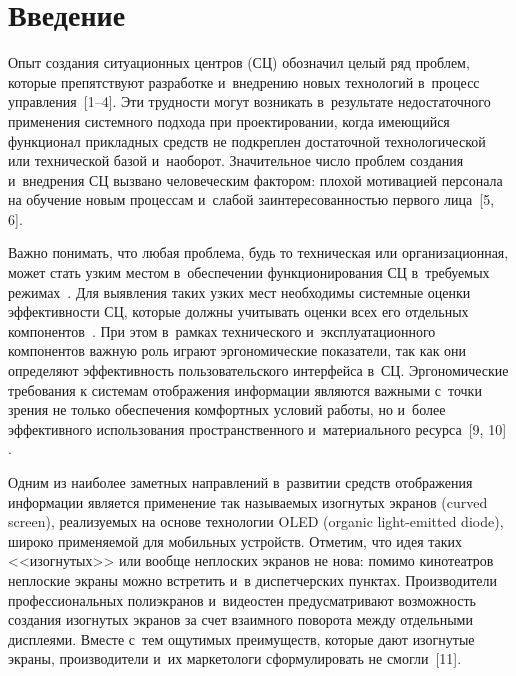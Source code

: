 
\thispagestyle{headings}

\begin{multicols}{2}

\label{st\stat}

\section{Введение}
	
     Опыт создания ситуационных центров (СЦ) обозначил целый ряд проблем,
которые препятствуют разработке и~внедрению новых технологий в~процесс
управления~[1--4]. Эти трудности могут возникать в~результате
недостаточного применения системного подхода при проектировании, когда
имеющийся функционал прикладных средств не подкреплен достаточной
технологической или технической базой и~наоборот. Значительное число
проблем создания и~внедрения СЦ вызвано человеческим фактором: плохой
мотивацией персонала на обучение новым процессам и~слабой
заинтересованностью первого лица~[5, 6].

     Важно понимать, что любая проблема, будь то техническая или
организационная, может стать узким местом в~обеспечении функционирования
СЦ в~требуемых режимах~\cite{3-zat, 7-zat}. Для
выявления таких узких мест необходимы системные оценки эффективности
СЦ, которые должны учитывать оценки всех его отдельных
компонентов~\cite{8-zat}. При этом в~рамках технического
и~эксплуатационного компонентов важную роль играют эргономические
показатели, так как они определяют эффективность пользовательского
интерфейса в~СЦ. Эргономические требования к системам
отображения информации являются важными с~точки зрения не только
обеспечения комфортных условий работы, но и~более эффективного
использования пространственного и~материального ресурса~[9, 10] .

     Одним из наиболее заметных направлений в~развитии средств
отображения информации является применение так называемых изогнутых
экранов (curved screen), реализуемых на основе технологии OLED
(organic light-emitted diode), широко
применяемой для мобильных устройств. Отметим, что идея таких
<<изогнутых>> или вообще неплоских экранов не нова: помимо кинотеатров
неплоские экраны можно встретить и~в диспетчерских пунктах. Производители
профессиональных полиэкранов и~видеостен предусматривают возможность
создания изогнутых экранов за счет взаимного поворота между отдельными
дисплеями. Вместе с~тем ощутимых преимуществ, которые дают изогнутые
экраны, производители и~их маркетологи сформулировать не смогли~[11].


\end{multicols}
